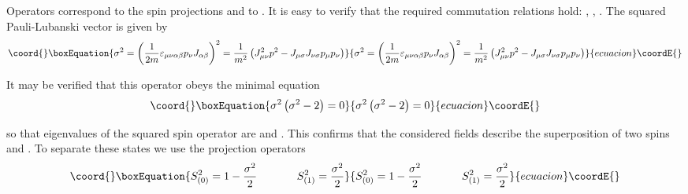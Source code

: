 \documentclass[a4paper,12pt]{article}
\begin{document}
Operators \coordHE{} correspond to the spin projections
\coordHE{} and \coordHE{} to \coordHE{}. It is easy to verify that
the required commutation relations hold: \coordHE{}, \coordHE{}, \coordHE{}.
The squared Pauli-Lubanski vector \coordHE{} is given by
\begin{equation}\coord{}\boxEquation{
\sigma ^2=\left( \frac 1{2m}\varepsilon _{\mu \nu \alpha \beta }p_\nu
J_{\alpha \beta }\right) ^2=\frac 1{m^2}\left( J_{\mu \nu }^2p^2-J_{\mu
\sigma }J_{\nu \sigma }p_\mu p_\nu \right)  \label{29}
}{
\sigma ^2=\left( \frac 1{2m}\varepsilon _{\mu \nu \alpha \beta }p_\nu
J_{\alpha \beta }\right) ^2=\frac 1{m^2}\left( J_{\mu \nu }^2p^2-J_{\mu
\sigma }J_{\nu \sigma }p_\mu p_\nu \right)  }{ecuacion}\coordE{}\end{equation}

It may be verified that this operator obeys the minimal equation
\begin{equation}\coord{}\boxEquation{
\sigma ^2\left( \sigma ^2-2\right) =0  \label{30}
}{
\sigma ^2\left( \sigma ^2-2\right) =0  }{ecuacion}\coordE{}\end{equation}

so that eigenvalues of the squared spin operator \coordHE{} are \coordHE{}
and \coordHE{}. This confirms that the considered fields describe the
superposition of two spins \coordHE{} and \coordHE{}. To separate these states we use
the projection operators
\begin{equation}\coord{}\boxEquation{
S_{(0)}^2=1-\frac{\sigma ^2}2\hspace{0.5in}S_{(1)}^2=\frac{\sigma ^2}2
\label{31}
}{
S_{(0)}^2=1-\frac{\sigma ^2}2\hspace{0.5in}S_{(1)}^2=\frac{\sigma ^2}2
}{ecuacion}\coordE{}\end{equation}
\end{document}

